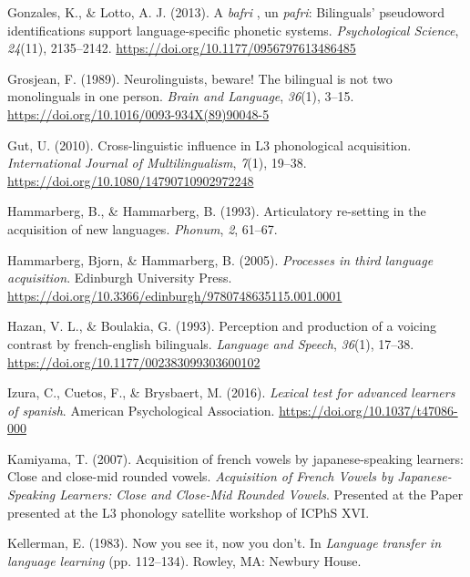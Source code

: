 \documentclass[
  man]{apa6}
\newlength{\cslhangindent}
\newlength{\cslentryspacingunit} %
\newenvironment{CSLReferences}[2] %
 {%
  \setlength{\parindent}{0pt}
  \ifodd #1
  \let\oldpar\par
  \def\par{\hangindent=\cslhangindent\oldpar}
  \fi
  \setlength{\parskip}{#2\cslentryspacingunit}
 }%
 {}
\begin{document}
\begin{CSLReferences}{1}{0}
\leavevmode{}%
Gonzales, K., \& Lotto, A. J. (2013). A \emph{bafri} , un \emph{pafri}: Bilinguals' pseudoword identifications support language-specific phonetic systems. \emph{Psychological Science}, \emph{24}(11), 2135--2142. \url{https://doi.org/10.1177/0956797613486485}

\leavevmode{}%
Grosjean, F. (1989). Neurolinguists, beware! The bilingual is not two monolinguals in one person. \emph{Brain and Language}, \emph{36}(1), 3--15. \url{https://doi.org/10.1016/0093-934X(89)90048-5}

\leavevmode{}%
Gut, U. (2010). Cross-linguistic influence in L3 phonological acquisition. \emph{International Journal of Multilingualism}, \emph{7}(1), 19--38. \url{https://doi.org/10.1080/14790710902972248}

\leavevmode{}%
Hammarberg, B., \& Hammarberg, B. (1993). Articulatory re-setting in the acquisition of new languages. \emph{Phonum}, \emph{2}, 61--67.

\leavevmode{}%
Hammarberg, Bjorn, \& Hammarberg, B. (2005). \emph{Processes in third language acquisition}. Edinburgh University Press. \url{https://doi.org/10.3366/edinburgh/9780748635115.001.0001}

\leavevmode{}%
Hazan, V. L., \& Boulakia, G. (1993). Perception and production of a voicing contrast by french-english bilinguals. \emph{Language and Speech}, \emph{36}(1), 17--38. \url{https://doi.org/10.1177/002383099303600102}

\leavevmode{}%
Izura, C., Cuetos, F., \& Brysbaert, M. (2016). \emph{Lexical test for advanced learners of spanish}. American Psychological Association. \url{https://doi.org/10.1037/t47086-000}

\leavevmode{}%
Kamiyama, T. (2007). Acquisition of french vowels by japanese-speaking learners: Close and close-mid rounded vowels. \emph{Acquisition of French Vowels by Japanese-Speaking Learners: Close and Close-Mid Rounded Vowels}. Presented at the Paper presented at the L3 phonology satellite workshop of {ICPhS} {XVI}.

\leavevmode{}%
Kellerman, E. (1983). Now you see it, now you don't. In \emph{Language transfer in language learning} (pp. 112--134). Rowley, {MA}: Newbury House.


\end{CSLReferences}
\end{document}
